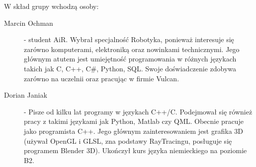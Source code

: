 W skład grupy wchodzą osoby:
\begin{description}
\item[Marcin Ochman] - student AiR. Wybrał specjalność Robotyka, ponieważ interesuje się zarówno komputerami, elektroniką oraz nowinkami technicznymi.
	Jego głównym atutem jest umiejętność programowania w różnych językach takich jak C, C++, C\#, Python, SQL. 
	Swoje doświadczenie zdobywa zarówno na uczelnii oraz pracując w firmie Vulcan.
\item[Dorian Janiak] - Pisze od kilku lat programy w językach C++/C. Podejmował się również pracy z takimi językami jak Python, Matlab czy QML. Obecnie pracuje jako programista C++. Jego głównym zainteresowaniem jest grafika 3D (używał OpenGL i GLSL, zna podstawy RayTracingu, posługuje się programem Blender 3D). Ukończył kurs języka niemieckiego na poziomie B2.
\end{description}
